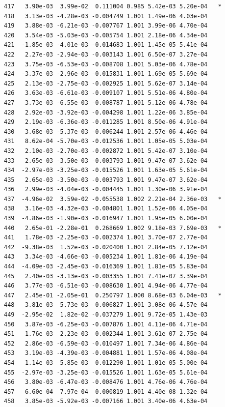 \documentclass[
  letterpaper,
  DIV=11,
  numbers=noendperiod]{scrartcl}
\begin{document}
\begin{verbatim}
417   3.90e-03  3.99e-02  0.111004 0.985 5.42e-03 5.20e-04   *
418   3.13e-03 -4.28e-03 -0.004749 1.001 1.49e-06 4.03e-04    
419   3.88e-03 -6.21e-03 -0.007767 1.001 3.99e-06 4.70e-04    
420   3.54e-03 -5.03e-03 -0.005754 1.001 2.18e-06 4.34e-04    
421  -1.85e-03 -4.01e-03 -0.014683 1.001 1.45e-05 5.41e-04    
422   2.27e-03 -2.94e-03 -0.003143 1.001 6.50e-07 3.27e-04    
423   3.75e-03 -6.53e-03 -0.008708 1.001 5.03e-06 4.78e-04    
424  -3.37e-03 -2.96e-03 -0.015831 1.001 1.69e-05 5.69e-04    
425   2.13e-03 -2.75e-03 -0.002925 1.001 5.62e-07 3.14e-04    
426   3.63e-03 -6.61e-03 -0.009107 1.001 5.51e-06 4.80e-04    
427   3.73e-03 -6.55e-03 -0.008787 1.001 5.12e-06 4.78e-04    
428   2.92e-03 -3.92e-03 -0.004298 1.001 1.22e-06 3.85e-04    
429   2.19e-03 -6.36e-03 -0.011285 1.001 8.50e-06 4.91e-04    
430   3.68e-03 -5.37e-03 -0.006244 1.001 2.57e-06 4.46e-04    
431   8.62e-04 -5.70e-03 -0.012536 1.001 1.05e-05 5.03e-04    
432   2.10e-03 -2.70e-03 -0.002872 1.001 5.42e-07 3.10e-04    
433   2.65e-03 -3.50e-03 -0.003793 1.001 9.47e-07 3.62e-04    
434  -2.97e-03 -3.25e-03 -0.015526 1.001 1.63e-05 5.61e-04    
435   2.65e-03 -3.50e-03 -0.003793 1.001 9.47e-07 3.62e-04    
436   2.99e-03 -4.04e-03 -0.004445 1.001 1.30e-06 3.91e-04    
437  -4.96e-02  3.59e-02 -0.055538 1.002 2.21e-04 2.36e-03   *
438   3.16e-03 -4.32e-03 -0.004801 1.001 1.52e-06 4.05e-04    
439  -4.86e-03 -1.90e-03 -0.016947 1.001 1.95e-05 6.00e-04    
440   2.65e-01 -2.28e-01  0.268669 1.002 9.18e-03 7.69e-03   *
441   1.78e-03 -2.25e-03 -0.002374 1.001 3.70e-07 2.77e-04    
442  -9.38e-03  1.52e-03 -0.020400 1.001 2.84e-05 7.12e-04    
443   3.34e-03 -4.66e-03 -0.005234 1.001 1.81e-06 4.19e-04    
444  -4.09e-03 -2.45e-03 -0.016369 1.001 1.81e-05 5.83e-04    
445   2.40e-03 -3.13e-03 -0.003355 1.001 7.41e-07 3.39e-04    
446   3.77e-03 -6.51e-03 -0.008630 1.001 4.94e-06 4.77e-04    
447   2.45e-01 -2.05e-01  0.250797 1.000 8.68e-03 6.04e-03   *
448   3.81e-03 -5.73e-03 -0.006827 1.001 3.08e-06 4.57e-04    
449  -2.95e-02  1.82e-02 -0.037279 1.001 9.72e-05 1.43e-03    
450   3.87e-03 -6.25e-03 -0.007876 1.001 4.11e-06 4.71e-04    
451   1.76e-03 -2.23e-03 -0.002344 1.001 3.61e-07 2.75e-04    
452   2.86e-03 -6.59e-03 -0.010497 1.001 7.34e-06 4.86e-04    
453   3.19e-03 -4.39e-03 -0.004881 1.001 1.57e-06 4.08e-04    
454   1.14e-03 -5.85e-03 -0.012290 1.001 1.01e-05 5.00e-04    
455  -2.97e-03 -3.25e-03 -0.015526 1.001 1.63e-05 5.61e-04    
456   3.80e-03 -6.47e-03 -0.008476 1.001 4.76e-06 4.76e-04    
457   6.60e-04 -7.97e-04 -0.000819 1.001 4.40e-08 1.32e-04    
458   3.85e-03 -5.92e-03 -0.007166 1.001 3.40e-06 4.63e-04    

\end{verbatim}
\end{document}
